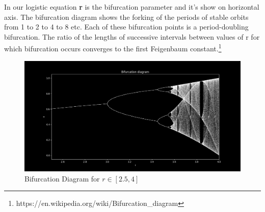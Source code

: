 \documentclass{report}
\begin{document}
In our logistic equation \textbf{r} is the bifurcation parameter and it's show on horizontal axis. The bifurcation diagram shows the forking of the periods of stable orbits from 1 to 2 to 4 to 8 etc. Each of these bifurcation points is a period-doubling bifurcation. The ratio of the lengths of successive intervals between values of r for which bifurcation occurs converges to the first Feigenbaum constant.\footnote[2]{https://en.wikipedia.org/wiki/Bifurcation\_diagram}

\begin{figure}[!h]
    \centering
    \includegraphics[scale=.45]{images/BifurcationDiag.png}
    \caption{Bifurcation Diagram for $r \in [2.5,4]$}
    \label{fig:my_label4}
\end{figure}
\end{document}
